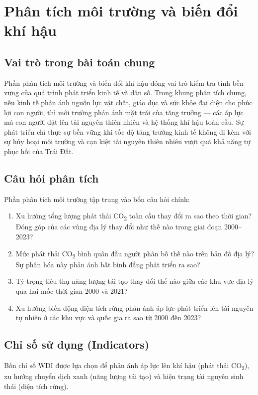 \section{Phân tích môi trường và biến đổi khí hậu}

\subsection{Vai trò trong bài toán chung}

Phần phân tích môi trường và biến đổi khí hậu đóng vai trò kiểm tra tính bền vững của quá trình phát triển kinh tế và dân số. Trong khung phân tích chung, nếu kinh tế phản ánh nguồn lực vật chất, giáo dục và sức khỏe đại diện cho phúc lợi con người, thì môi trường phản ánh mặt trái của tăng trưởng --- các áp lực mà con người đặt lên tài nguyên thiên nhiên và hệ thống khí hậu toàn cầu. Sự phát triển chỉ thực sự bền vững khi tốc độ tăng trưởng kinh tế không đi kèm với sự hủy hoại môi trường và cạn kiệt tài nguyên thiên nhiên vượt quá khả năng tự phục hồi của Trái Đất.

\subsection{Câu hỏi phân tích}

Phần phân tích môi trường tập trung vào bốn câu hỏi chính:
\begin{enumerate}
    \item Xu hướng tổng lượng phát thải CO\textsubscript{2} toàn cầu thay đổi ra sao theo thời gian? Đóng góp của các vùng địa lý thay đổi như thế nào trong giai đoạn 2000--2023?
    \item Mức phát thải CO\textsubscript{2} bình quân đầu người phân bố thế nào trên bản đồ địa lý? Sự phân hóa này phản ánh bất bình đẳng phát triển ra sao?
    \item Tỷ trọng tiêu thụ năng lượng tái tạo thay đổi thế nào giữa các khu vực địa lý qua hai mốc thời gian 2000 và 2021?
    \item Xu hướng biến động diện tích rừng phản ánh áp lực phát triển lên tài nguyên tự nhiên ở các khu vực và quốc gia ra sao từ 2000 đến 2023?
\end{enumerate}

\subsection{Chỉ số sử dụng (Indicators)}

Bốn chỉ số WDI được lựa chọn để phản ánh áp lực lên khí hậu (phát thải CO\textsubscript{2}), xu hướng chuyển dịch xanh (năng lượng tái tạo) và hiện trạng tài nguyên sinh thái (diện tích rừng).

